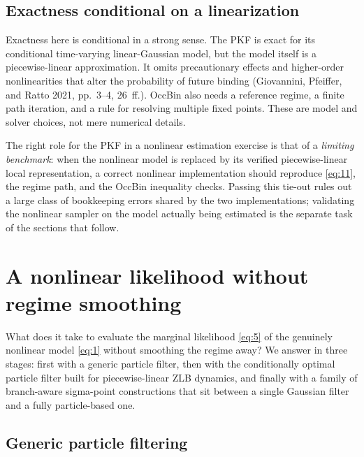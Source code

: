 \documentclass[11pt]{article}
\begin{document}
\subsection{Exactness conditional on a linearization}\label{sec:linear-limits}

Exactness here is conditional in a strong sense. The PKF is exact for its
conditional time-varying linear-Gaussian model, but the model itself is a
piecewise-linear approximation. It omits precautionary
effects and higher-order nonlinearities that alter the probability of future
binding (Giovannini, Pfeiffer, and Ratto 2021, pp.~3--4, 26~ff.). OccBin also
needs a reference regime, a finite path iteration, and a rule for resolving
multiple fixed points. These are model and solver choices, not mere numerical
details.

The right role for the PKF in a nonlinear estimation exercise is that of a
\emph{limiting benchmark}: when the nonlinear model is replaced by its
verified piecewise-linear local representation, a correct nonlinear
implementation should reproduce \eqref{eq:11}, the regime path, and the
OccBin inequality checks. Passing this tie-out rules out a large class of
bookkeeping errors shared by the two implementations; validating the
nonlinear sampler on the model actually being estimated is the separate
task of the sections that follow.

\section{A nonlinear likelihood without regime smoothing}
\label{sec:particle}

What does it take to evaluate the marginal likelihood \eqref{eq:5} of the
genuinely nonlinear model \eqref{eq:1} without smoothing the regime away?
We answer in three stages: first with a generic particle filter, then with the
conditionally optimal particle filter built for piecewise-linear ZLB dynamics,
and finally with a family of branch-aware sigma-point constructions that sit
between a single Gaussian filter and a fully particle-based one.

\subsection{Generic particle filtering}
\label{sec:pf-generic}
\end{document}
